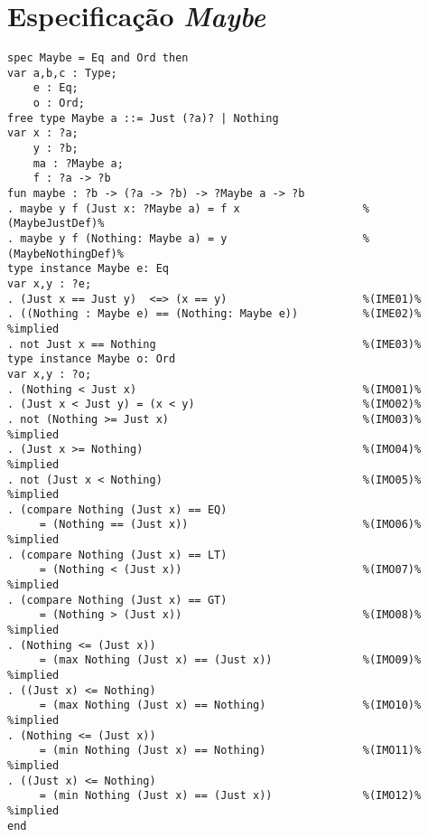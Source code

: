 \section{Especificação \textit{Maybe}}
\label{appendix:lazySpec:maybe}
\begin{Verbatim}
spec Maybe = Eq and Ord then
var a,b,c : Type;
    e : Eq;
    o : Ord;
free type Maybe a ::= Just (?a)? | Nothing
var x : ?a;
    y : ?b;
    ma : ?Maybe a;
    f : ?a -> ?b
fun maybe : ?b -> (?a -> ?b) -> ?Maybe a -> ?b
. maybe y f (Just x: ?Maybe a) = f x                   %(MaybeJustDef)%
. maybe y f (Nothing: Maybe a) = y                     %(MaybeNothingDef)%
type instance Maybe e: Eq
var x,y : ?e; 
. (Just x == Just y)  <=> (x == y)                     %(IME01)%
. ((Nothing : Maybe e) == (Nothing: Maybe e))          %(IME02)% %implied
. not Just x == Nothing                                %(IME03)%
type instance Maybe o: Ord
var x,y : ?o;
. (Nothing < Just x)                                   %(IMO01)%
. (Just x < Just y) = (x < y)                          %(IMO02)%
. not (Nothing >= Just x)                              %(IMO03)% %implied
. (Just x >= Nothing)                                  %(IMO04)% %implied
. not (Just x < Nothing)                               %(IMO05)% %implied
. (compare Nothing (Just x) == EQ)
     = (Nothing == (Just x))                           %(IMO06)% %implied
. (compare Nothing (Just x) == LT)
     = (Nothing < (Just x))                            %(IMO07)% %implied
. (compare Nothing (Just x) == GT)
     = (Nothing > (Just x))                            %(IMO08)% %implied
. (Nothing <= (Just x))
     = (max Nothing (Just x) == (Just x))              %(IMO09)% %implied
. ((Just x) <= Nothing)
     = (max Nothing (Just x) == Nothing)               %(IMO10)% %implied
. (Nothing <= (Just x))
     = (min Nothing (Just x) == Nothing)               %(IMO11)% %implied
. ((Just x) <= Nothing)
     = (min Nothing (Just x) == (Just x))              %(IMO12)% %implied
end
\end{Verbatim}

